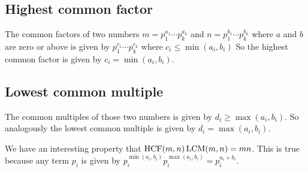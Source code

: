 \subsection{Highest common factor}
The common factors of two numbers \(m = p_1^{a_1} \cdots p_k^{a_k}\) and \(n = p_1^{b_1} \cdots p_k^{b_k}\) where \(a\) and \(b\) are zero or above is given by \(p_1^{c_1} \cdots p_k^{c_k}\) where \(c_i \leq \min(a_i, b_i)\) So the highest common factor is given by \(c_i = \min(a_i, b_i)\).

\subsection{Lowest common multiple}
The common multiples of those two numbers is given by \(d_i \geq \max(a_i, b_i)\).
So analogously the lowest common multiple is given by \(d_i = \max(a_i, b_i)\).

We have an interesting property that \(\operatorname{HCF}(m, n) \operatorname{LCM}(m, n) = mn\).
This is true because any term \(p_i\) is given by \(p_i^{\min(a_i, b_i)}p_i^{\max(a_i, b_i)} = p_i^{a_i + b_i}\).
